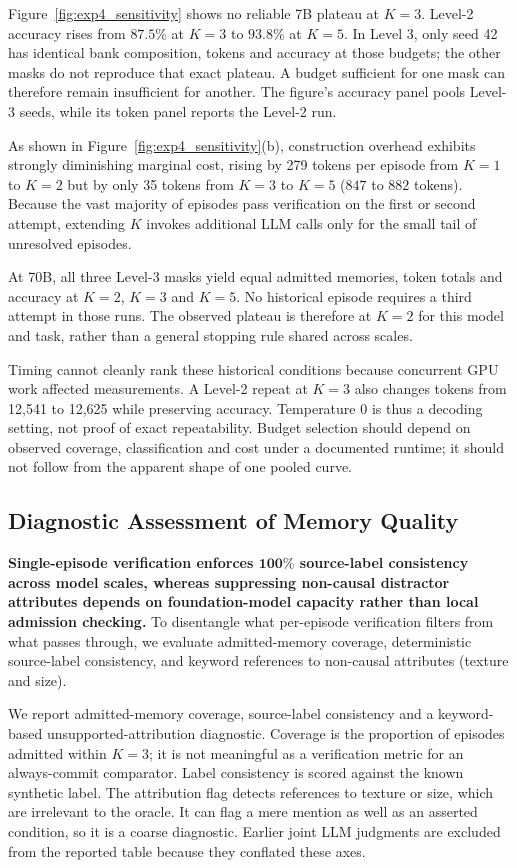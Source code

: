 \documentclass[journal]{IEEEtran}
\theoremstyle{definition}
\theoremstyle{remark}
\begin{document}
Figure~\ref{fig:exp4_sensitivity} shows no reliable 7B plateau at $K=3$. Level-2 accuracy rises from $87.5\%$ at $K=3$ to $93.8\%$ at $K=5$. In Level 3, only seed 42 has identical bank composition, tokens and accuracy at those budgets; the other masks do not reproduce that exact plateau. A budget sufficient for one mask can therefore remain insufficient for another. The figure's accuracy panel pools Level-3 seeds, while its token panel reports the Level-2 run.

As shown in Figure~\ref{fig:exp4_sensitivity}(b), construction overhead exhibits strongly diminishing marginal cost, rising by 279 tokens per episode from $K=1$ to $K=2$ but by only 35 tokens from $K=3$ to $K=5$ ($847$ to $882$ tokens). Because the vast majority of episodes pass verification on the first or second attempt, extending $K$ invokes additional LLM calls only for the small tail of unresolved episodes.

At 70B, all three Level-3 masks yield equal admitted memories, token totals and accuracy at $K=2$, $K=3$ and $K=5$. No historical episode requires a third attempt in those runs. The observed plateau is therefore at $K=2$ for this model and task, rather than a general stopping rule shared across scales.

Timing cannot cleanly rank these historical conditions because concurrent GPU work affected measurements. A Level-2 repeat at $K=3$ also changes tokens from 12,541 to 12,625 while preserving accuracy. Temperature $0$ is thus a decoding setting, not proof of exact repeatability. Budget selection should depend on observed coverage, classification and cost under a documented runtime; it should not follow from the apparent shape of one pooled curve.

\subsection{Diagnostic Assessment of Memory Quality}
\label{sec:exp5}

\textbf{Single-episode verification enforces $\boldsymbol{100\%}$ source-label consistency across model scales, whereas suppressing non-causal distractor attributes depends on foundation-model capacity rather than local admission checking.} To disentangle what per-episode verification filters from what passes through, we evaluate admitted-memory coverage, deterministic source-label consistency, and keyword references to non-causal attributes (texture and size).

We report admitted-memory coverage, source-label consistency and a keyword-based unsupported-attribution diagnostic. Coverage is the proportion of episodes admitted within $K=3$; it is not meaningful as a verification metric for an always-commit comparator. Label consistency is scored against the known synthetic label. The attribution flag detects references to texture or size, which are irrelevant to the oracle. It can flag a mere mention as well as an asserted condition, so it is a coarse diagnostic. Earlier joint LLM judgments are excluded from the reported table because they conflated these axes.
\end{document}
